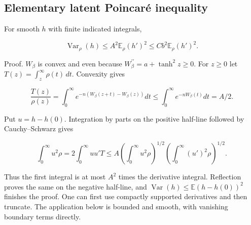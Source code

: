 \subsection{Elementary latent Poincaré inequality}\label{cw:elementary-latent-poincaruxe9-inequality}

For smooth $h$ with finite indicated integrals,

\[
\boxed{\operatorname{Var}_{\rho}(h)\le A^2\mathbb E_{\rho}(h')^2
\le Cb^2\mathbb E_{\rho}(h')^2.}
\]

Proof. \(W_\beta\) is convex and even because \(W_\beta^{\prime\prime}=a+\tanh^2z\ge0\). For \(z\ge0\) let \(T(z)=\int_z^\infty\rho(t)\,dt\). Convexity gives

\[
\frac{T(z)}{\rho(z)}
=\int_0^\infty e^{-n(W_\beta(z+t)-W_\beta(z))}dt
\le\int_0^\infty e^{-nW_\beta(t)}dt=A/2.
\]

Put \(u=h-h(0)\). Integration by parts on the positive half-line followed by Cauchy--Schwarz gives

\[
\int_0^\infty u^2\rho
=2\int_0^\infty uu'T
\le A\left(\int_0^\infty u^2\rho\right)^{1/2}
       \left(\int_0^\infty (u')^2\rho\right)^{1/2}.
\]

Thus the first integral is at most \(A^2\) times the derivative integral. Reflection proves the same on the negative half-line, and \(\operatorname{Var}(h)\le\mathbb E(h-h(0))^2\) finishes the proof. One can first use compactly supported derivatives and then truncate. The application below is bounded and smooth, with vanishing boundary terms directly.

